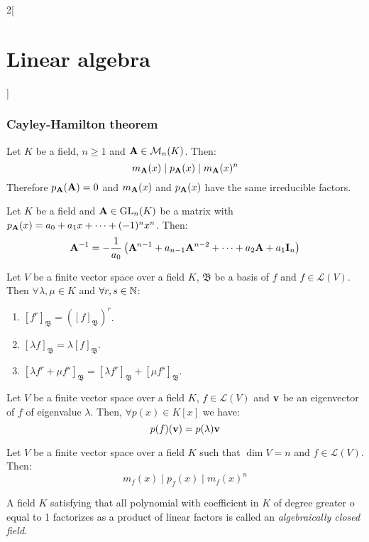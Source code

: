 \documentclass[../../../main.tex]{subfiles}
\begin{document}
\begin{multicols}{2}[\section{Linear algebra}]
  \subsubsection*{Cayley-Hamilton theorem}
  \begin{theorem}
    Let $K$ be a field, $n\geq 1$ and $\vb{A}\in\mathcal{M}_n(K)$. Then: $$m_{\vb{A}}(x)\mid p_{\vb{A}}(x)\mid m_{\vb{A}}(x)^n$$ Therefore $p_{\vb{A}}(\vb{A})=0$ and $m_{\vb{A}}(x)$ and $p_{\vb{A}}(x)$ have the same irreducible factors.
  \end{theorem}
  \begin{corollary}
    Let $K$ be a field and $\vb{A}\in\mathrm{GL}_n(K)$ be a matrix with $p_{\vb{A}}(x)=a_0+a_1x+\cdots+(-1)^nx^n$. Then: $$\vb{A}^{-1}=-\frac{1}{a_0}\left(\vb{A}^{n-1}+a_{n-1}\vb{A}^{n-2}+\cdots+a_2\vb{A}+a_1\vb{I}_n\right)$$
  \end{corollary}
  \begin{lemma}
    Let $V$ be a finite vector space over a field $K$, $\mathfrak{B}$ be a basis of $f$ and $f\in\mathcal{L}(V)$. Then $\forall\lambda,\mu\in K$ and $\forall r,s\in\mathbb{N}$:
    \begin{enumerate}
      \item $[f^r]_\mathfrak{B}={\left([f]_\mathfrak{B}\right)}^r$.
      \item $[\lambda f]_\mathfrak{B}=\lambda[f]_\mathfrak{B}$.
      \item $[\lambda f^r+\mu f^s]_\mathfrak{B}=[\lambda f^r]_\mathfrak{B}+[\mu f^s]_\mathfrak{B}$.
    \end{enumerate}
  \end{lemma}
  \begin{lemma}
    Let $V$ be a finite vector space over a field $K$, $f\in\mathcal{L}(V)$ and $\vb{v}$ be an eigenvector of $f$ of eigenvalue $\lambda$. Then, $\forall p(x)\in K[x]$ we have: $$p(f)(\vb{v})=p(\lambda)\vb{v}$$
  \end{lemma}
  \begin{theorem}
    Let $V$ be a finite vector space over a field $K$ such that $\dim V=n$ and $f\in\mathcal{L}(V)$. Then: $$m_f(x)\mid p_f(x)\mid m_f(x)^n$$
  \end{theorem}
  \begin{definition}
    A field $K$ satisfying that all polynomial with coefficient in $K$ of degree greater o equal to 1 factorizes as a product of linear factors is called an \textit{algebraically closed field}.

\end{definition}
\end{multicols}
\end{document}
